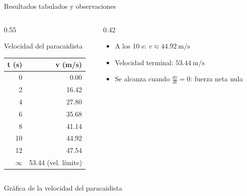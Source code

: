 \documentclass[main.tex]{subfiles}
\begin{document}
\begin{frame}[c]{Resultados tabulados y observaciones}
\begin{columns}[T,onlytextwidth]
  \begin{column}{0.55\textwidth}
    \begin{block}{Velocidad del paracaidista}
    \begin{tabular}{@{}rr@{}}
    \toprule
    \textbf{t (s)} & \textbf{v (m/s)} \\
    \midrule
     0  & 0.00 \\
     2  & 16.42 \\
     4  & 27.80 \\
     6  & 35.68 \\
     8  & 41.14 \\
    10  & 44.92 \\
    12  & 47.54 \\
    $\infty$ & 53.44 (vel. límite)\\
    \bottomrule
    \end{tabular}
    \end{block}
  \end{column}
  \begin{column}{0.42\textwidth}
    \begin{itemize}
      \item A los 10 s: \(v \approx 44.92~\text{m/s}\)
      \item Velocidad terminal: \(53.44~\text{m/s}\)
      \item Se alcanza cuando \(\frac{dv}{dt} = 0\): fuerza neta nula
    \end{itemize}
  \end{column}
\end{columns}
\end{frame}

\begin{frame}[c]{Gráfica de la velocidad del paracaidista}
\centering
\footnotesize
{}
\end{frame}
\end{document}
